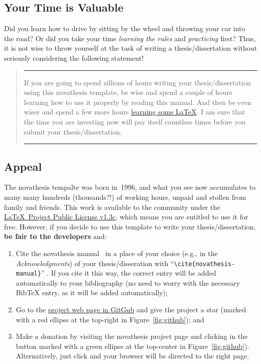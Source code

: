 \subsection{Your Time is Valuable}
\label{sub:time_is_money}

Did you learn how to drive by sitting by the wheel and throwing your car into the road?  Or did you take your time \emph{learning the rules} and \emph{practicing} first?  Thus, it is not wise to throw yourself at the task of writing a thesis/dissertation without seriously considering the following statement!

\begin{quote}
  \rule{\linewidth}{2pt}
If you are going to spend zillions of hours writing your thesis/dissertation using this \gls{novathesis} template, be wise and spend a couple of hours learning how to use it properly by reading this manual.  And then be even wiser and spend a few more hours \href{https://github.com/joaomlourenco/novathesis/wiki#learning-latex}{learning some \LaTeX}.  I am sure that the time you are investing now will pay itself countless times before you submit your thesis/dissertation.
\hfill {}\\[-1ex]
  \rule{\linewidth}{2pt}
\end{quote}

\subsection{Appeal}
\label{sub:appeal}

The \gls{novathesis} tempalte was born in~1996, and what you see now accumulates to many many hundreds (thousands?!) of working hours, unpaid and stollen from family and friends.  This work is available to the community under the \href{LaTeX project public license}{\LaTeX\ Project Public License v1.3c}, which means you are entitled to use it for free.  However, if you decide to use this template to write your thesis/dissertation, \textbf{be fair to the developers} and:
\begin{enumerate}
  \item Cite the \gls{novathesis} manual~\cite{novathesis-manual} in a place of your choice (e.g., in the \emph{Acknowledgments}) of your thesis/disseration with “\verb!\cite{novathesis-manual}!” .  If you cite it this way, the correct entry will be added automatically to your bibliography (no need to worry with the necessary BibTeX entry, as it will be added automatically);
  \item Go to the
\href{https://github.com/joaomlourenco/novathesis}{project web page in GitGub} and give the project a star (marked with a red ellipse at the top-right in Figure~\ref{fig:github}); and
  \item Make a donation by visiting the \gls{novathesis} project page and clicking in the button marked with a green ellipse at the top-center in Figure~\ref{fig:github}).  Alternatively, just click \href{https://www.paypal.com/donate/?hosted_button_id=8WA8FRVMB78W8}{} and your browser will be directed to the right page.
\end{enumerate}

